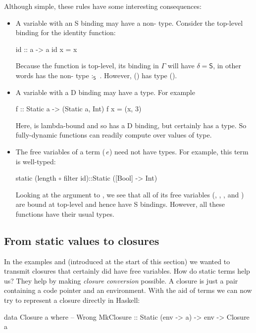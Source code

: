 \documentclass[preprint]{sigplanconf}
\begin{document}
Although simple, these rules have some interesting consequences:
\begin{itemize}
\item A variable with an \textsf{S} binding may have a non- type. Consider the 
top-level binding for the identity function:
\begin{code}
  id :: a -> a
  id x = x
\end{code}
Because the function  is top-level, its binding
in $\Gamma$ will have $\delta=\textsf{S}$, in other words  has the
non- type  $:_{\textsf{S}}$ . However, ($\!$) has type ($\!$).

\item A variable with a \textsf{D} binding may have a  type.  For example
\begin{code}
  f :: Static a -> (Static a, Int)
  f x = (x, 3)
\end{code}
Here,  is lambda-bound and so has a \textsf{D} binding,  but  certainly has
a  type.  So fully-dynamic functions
can readily compute over values of  type.

\item The free variables of a term ($\!$$\,e$) need not have
 types. For example, this term is well-typed:
\par{\small
\begin{code}
static (length$\,\circ\,$filter id)::Static ([Bool] -> Int)
\end{code}
}
Looking at the argument to , we see that all of its free variables (, \textt{($\circ$)},
, and ) are bound at top-level and hence have \textsf{S}
bindings. However, all these functions have their usual types.
\end{itemize}
\subsection{From static values to closures}

In the examples  and
 (introduced at the start of this section) we wanted to transmit closures
that certainly did have free variables.  How do static terms help us?
They help by making \emph{closure conversion} possible. A closure
is just a pair containing a code pointer and an environment.  With the aid of
 terms we can now try to represent a closure directly in Haskell:
\begin{code}
data Closure a where   -- Wrong
  MkClosure :: Static (env -> a) -> env -> Closure a
\end{code}
\end{document}
